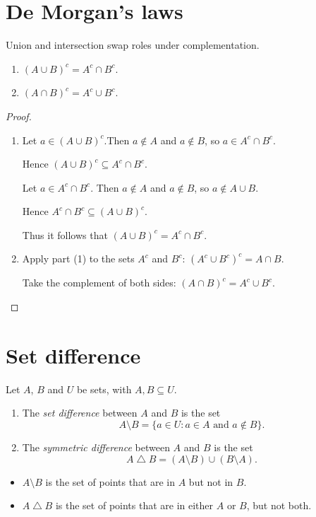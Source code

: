 \documentclass[lecture]{csm}
\def\it{\item}
\def\bit{\begin{itemize}}
\def\eit{\end{itemize}}
\def\ben{\begin{enumerate}}
\def\een{\end{enumerate}}
\begin{document}
\section{De Morgan's laws}
Union and intersection swap roles under complementation.

\begin{theorem}\label{thm:demorgan_simple}
\ben
\it $(A\cup B)^c = A^c\cap B^c$.
\it $(A\cap B)^c = A^c\cup B^c$.
\een
\end{theorem}

\begin{proof}
\ben
\it 
Let $a\in(A\cup B)^c$.Then $a\notin A$ and $a\notin B$, so $a\in A^c\cap B^c$.\par
\quad Hence $(A\cup B)^c\subseteq A^c\cap B^c$.\par
Let $a\in A^c\cap B^c$. Then $a\notin A$ and $a\notin B$, so $a\notin A\cup B$.\par
\quad Hence $A^c\cap B^c\subseteq (A\cup B)^c$.\par
Thus it follows that $(A\cup B)^c = A^c\cap B^c$.
\it 
Apply part (1) to the sets $A^c$ and $B^c$: $(A^c\cup B^c)^c = A\cap B$.\par
Take the complement of both sides: $(A\cap B)^c = A^c\cup B^c$.
\een
\end{proof}



\section{Set difference}
\begin{definition}
Let $A$, $B$ and $U$ be sets, with $A,B\subseteq U$.
\ben
\it The \emph{set difference} between $A$ and $B$ is the set
$$
A\setminus B = \{a\in U : a\in A \text{ and } a\notin B\}. %
$$
\it The \emph{symmetric difference} between $A$ and $B$ is the set 
$$
A\bigtriangleup B = (A\setminus B) \cup (B\setminus A). %
$$
\een
\end{definition}

\bit
\it $A\setminus B$ is the set of points that are in $A$ but not in $B$.
\it $A\bigtriangleup B$ is the set of points that are in either $A$ or $B$, but not both.
\eit
\end{document}
